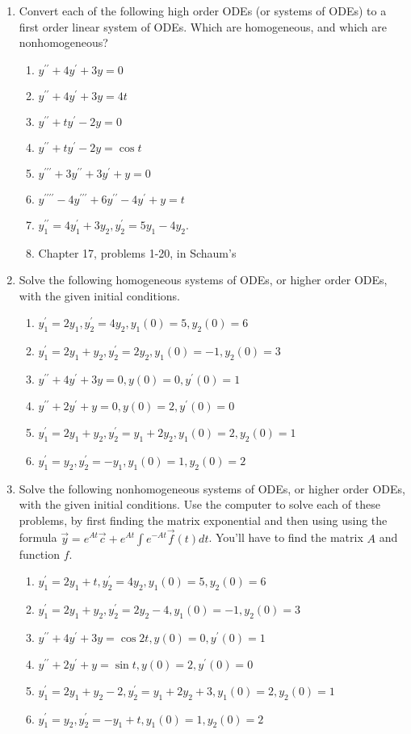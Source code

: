 \begin{multicols}{2}
\begin{enumerate}
\item Convert each of the following high order ODEs (or systems of ODEs) to a first order linear system of ODEs. Which are homogeneous, and which are nonhomogeneous?
\begin{enumerate}
	\item $y^{\prime\prime}+4y^\prime+3y=0$
	\item $y^{\prime\prime}+4y^\prime+3y=4t$
	\item $y^{\prime\prime}+ty^\prime-2y=0$
	\item $y^{\prime\prime}+ty^\prime-2y=\cos t$
	\item $y^{\prime\prime\prime}+3y^{\prime\prime}+3y^\prime+y=0$
	\item $y^{\prime\prime\prime\prime}-4y^{\prime\prime\prime}+6y^{\prime\prime}-4y^\prime+y=t$	
	\item $y_1^{\prime\prime}=4y_1^\prime+3y_2, y_2^\prime =5y_1-4y_2$.
	\item Chapter 17, problems 1-20, in Schaum's
\end{enumerate}


\item Solve the following homogeneous systems of ODEs, or higher order ODEs, with the given initial conditions.
\begin{enumerate}
	\item $y_1^\prime=2y_1, y_2^\prime=4y_2, y_1(0)=5, y_2(0)=6$
	\item $y_1^\prime=2y_1+y_2, y_2^\prime=2y_2, y_1(0)=-1, y_2(0)=3$
	\item $y^{\prime\prime}+4y^\prime+3y=0, y(0)=0, y^\prime(0)=1$
	\item $y^{\prime\prime}+2y^\prime+y=0, y(0)=2, y^\prime(0)=0$
	\item $y_1^\prime=2y_1+y_2, y_2^\prime=y_1+2y_2, y_1(0)=2, y_2(0)=1$
	\item $y_1^\prime=y_2, y_2^\prime=-y_1, y_1(0)=1, y_2(0)=2$
\end{enumerate}

\item Solve the following nonhomogeneous systems of ODEs, or higher order ODEs, with the given initial conditions. Use the computer to solve each of these problems, by first finding the matrix exponential and then using using the formula $\vec y = e^{At}\vec c+e^{At}\int e^{-At}\vec f(t)dt$.  You'll have to find the matrix $A$ and function $f$.
\begin{enumerate}
	\item $y_1^\prime=2y_1+t, y_2^\prime=4y_2, y_1(0)=5, y_2(0)=6$
	\item $y_1^\prime=2y_1+y_2, y_2^\prime=2y_2-4, y_1(0)=-1, y_2(0)=3$
	\item $y^{\prime\prime}+4y^\prime+3y=\cos 2t, y(0)=0, y^\prime(0)=1$
	\item $y^{\prime\prime}+2y^\prime+y=\sin t, y(0)=2, y^\prime(0)=0$
	\item $y_1^\prime=2y_1+y_2-2, y_2^\prime=y_1+2y_2+3, y_1(0)=2, y_2(0)=1$
	\item $y_1^\prime=y_2, y_2^\prime=-y_1+t, y_1(0)=1, y_2(0)=2$
\end{enumerate}


\end{enumerate}
\end{multicols}

